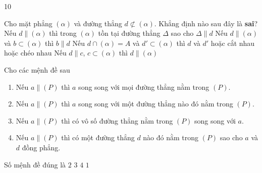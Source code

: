 \begin{indapan}{10}
	\begin{ex}%
		Cho mặt phẳng $(\alpha)$ và đường thẳng $d \not\subset (\alpha)$. Khẳng định nào sau đây là \textbf{sai}?
		\choice
		{Nếu $d \parallel (\alpha)$ thì trong $(\alpha)$ tồn tại đường thẳng $\Delta$ sao cho $\Delta \parallel d$}
		{\True Nếu $d \parallel (\alpha)$ và $b \subset (\alpha)$ thì $b \parallel d$}
		{Nếu $d \cap (\alpha)=A$ và $d' \subset (\alpha)$ thì $d$ và $d'$ hoặc cắt nhau hoặc chéo nhau}
		{Nếu $d \parallel c$, $c \subset (\alpha)$ thì $d \parallel (\alpha)$}
	\end{ex}

	\begin{ex}%
		Cho các mệnh đề sau
		\begin{enumerate}[1.]
			\item Nếu $a \parallel (P)$ thì $a$ song song với mọi đường thẳng nằm trong $(P)$.
			\item Nếu $a \parallel (P)$ thì $a$ song song với một đường thẳng nào đó nằm trong $(P)$.
			\item Nếu $a \parallel (P)$ thì có vô số đường thẳng nằm trong $(P)$ song song với $a$.
			\item Nếu $a \parallel (P)$ thì có một đường thẳng $d$ nào đó nằm trong $(P)$ sao cho $a$ và $d$ đồng phẳng.
		\end{enumerate}
		Số mệnh đề đúng là
		\choice
		{$2$}
		{\True $3$}
		{$4$}
		{$1$}
	\end{ex}


\end{indapan}
